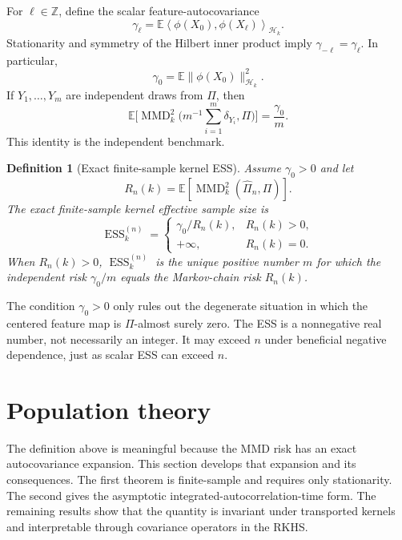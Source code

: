 \documentclass[11pt]{article}
\newtheorem{definition}{Definition}
\newcommand{\E}{\mathbb{E}}
\newcommand{\1}{\mathbf{1}}
\newcommand{\inner}[2]{\left\langle #1, #2 \right\rangle}
\newcommand{\MMD}{\operatorname{MMD}}
\newcommand{\ESS}{\operatorname{ESS}}
\newcommand{\Hk}{\mathcal{H}_k}
\begin{document}
For $\ell\in\mathbb Z$, define the scalar feature-autocovariance
\begin{equation}
\label{eq:gamma}
\gamma_\ell=\E\inner{\phi(X_0)}{\phi(X_\ell)}_{\Hk}.
\end{equation}
Stationarity and symmetry of the Hilbert inner product imply $\gamma_{-\ell}=\gamma_\ell$. In particular,
\[
\gamma_0=\E\|\phi(X_0)\|_{\Hk}^2.
\]
If $Y_1,\ldots,Y_m$ are independent draws from $\Pi$, then
\begin{equation}
\label{eq:iid-risk}
\E\bigg[\MMD_k^2 \Big(m^{-1}\sum_{i=1}^m\delta_{Y_i},\Pi\Big)\bigg]=\frac{\gamma_0}{m}.
\end{equation}
This identity is the independent benchmark.

\begin{definition}[Exact finite-sample kernel ESS]
\label{def:kernel-ess}
Assume $\gamma_0>0$ and let
\[
R_n(k)=\E[\MMD_k^2(\hat\Pi_n,\Pi)].
\]
The exact finite-sample kernel effective sample size is
\begin{equation}
\label{eq:ess-def}
\ESS_k^{(n)}=
\begin{cases}
\gamma_0/R_n(k),& R_n(k)>0,\\[0.25em]
+\infty,& R_n(k)=0.
\end{cases}
\end{equation}
When $R_n(k)>0$, $\ESS_k^{(n)}$ is the unique positive number $m$ for which the independent risk $\gamma_0/m$ equals the Markov-chain risk $R_n(k)$.
\end{definition}

The condition $\gamma_0>0$ only rules out the degenerate situation in which the centered feature map is $\Pi$-almost surely zero. The ESS is a nonnegative real number, not necessarily an integer. It may exceed $n$ under beneficial negative dependence, just as scalar ESS can exceed $n$.






\section{Population theory}
\label{sec:population}

The definition above is meaningful because the MMD risk has an exact autocovariance expansion. This section develops that expansion and its consequences. The first theorem is finite-sample and requires only stationarity. The second gives the asymptotic integrated-autocorrelation-time form. The remaining results show that the quantity is invariant under transported kernels and interpretable through covariance operators in the RKHS.
\end{document}
